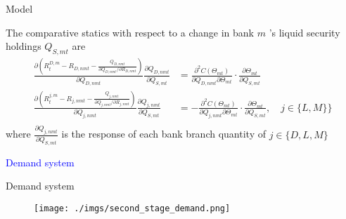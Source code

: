 \documentclass[notes,11pt, aspectratio=169]{beamer}
\begin{document}
\begin{frame}{Model}


    The comparative statics with respect to a change in bank $m$ 's liquid security holdings $Q_{S, m t}$ are
$$
\begin{aligned}
\frac{\partial\left(R_t^{D, m}-R_{D, n m t}-\frac{Q_{D, n m t}}{\partial Q_{D, n m t} / \partial R_{D, n m t}}\right)}{\partial Q_{D, n m t}} \frac{\partial Q_{D, n m t}}{\partial Q_{S, m t}} & =\frac{\partial^2 C\left(\Theta_{m t}\right)}{\partial Q_{D, n m t} \partial \Theta_{m t}} \cdot \frac{\partial \Theta_{m t}}{\partial Q_{S, m t}} \\
\frac{\partial\left(R_t^{j, m}-R_{j, n m t}-\frac{Q_{j, n m t}}{\partial Q_{j, n m t} / \partial R_{j, n m t}}\right)}{\partial Q_{j, n m t}} \frac{\partial Q_{j, n m t}}{\partial Q_{S, m t}} & =-\frac{\partial^2 C\left(\Theta_{m t}\right)}{\partial Q_{j, n m t} \partial \Theta_{m t}} \cdot \frac{\partial \Theta_{m t}}{\partial Q_{S, m t}}, \quad j \in \{ L,M\} \}  \\
\end{aligned}
$$
 where $\frac{\partial Q_{j, n m t}}{\partial Q_{S, m t}}$ is the response of each bank branch quantity of $j \in \{D,L,M \}$ %
\end{frame}


\begin{frame}
    \textcolor{blue}{\huge{\centerline{Demand system}}}
\end{frame}


  
\begin{frame}{Demand system}\label{demand}
    \vspace{0.5cm}
      
        \begin{figure}[t*]
          \centering
    
          \texttt{[image: ./imgs/second\_stage\_demand.png]}
       
        \end{figure}

        
      \end{frame}
\end{document}
